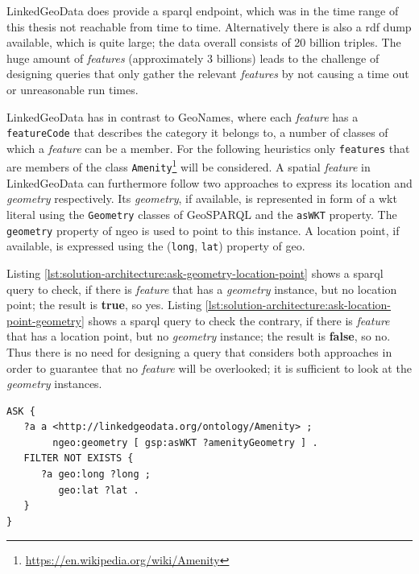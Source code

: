 \documentclass[draft,final]{vutinfth} %
\begin{document}
LinkedGeoData does provide a \gls{sparql} endpoint, which was in the time range of this thesis not reachable from time to time. Alternatively there is also a \gls{rdf} dump available, which is quite large; the data overall consists of 20 billion triples. The huge amount of \textit{features} (approximately 3 billions) leads to the challenge of designing queries that only gather the relevant \textit{features} by not causing a time out or unreasonable run times. 

LinkedGeoData has in contrast to GeoNames, where each \textit{feature} has a \texttt{featureCode} that describes the category it belongs to, a number of classes of which a \textit{feature} can be a member. For the following heuristics only \texttt{features} that are members of the class \texttt{Amenity}\footnote{\url{https://en.wikipedia.org/wiki/Amenity}} will be considered. A spatial \textit{feature} in LinkedGeoData can furthermore follow two approaches to express its location and \textit{geometry} respectively. Its \textit{geometry}, if available, is represented in form of a \gls{wkt} literal using the \texttt{Geometry} classes of GeoSPARQL and the \texttt{asWKT} property. The \texttt{geometry} property of \gls{ngeo} is used to point to this instance. A location point, if available, is expressed using the (\texttt{long}, \texttt{lat}) property of \gls{geo}. 

Listing \ref{lst:solution-architecture:ask-geometry-location-point} shows a \gls{sparql} query to check, if there is \textit{feature} that has a \textit{geometry} instance, but no location point; the result is \textbf{true}, so yes. Listing \ref{lst:solution-architecture:ask-location-point-geometry} shows a \gls{sparql} query to check the contrary, if there is \textit{feature} that has a location point, but no \textit{geometry} instance; the result is \textbf{false}, so no. Thus there is no need for designing a query that considers both approaches in order to guarantee that no \textit{feature} will be overlooked; it is sufficient to look at the \textit{geometry} instances.

\begin{lstlisting}[language=sparql, frame=single, basicstyle=\footnotesize, caption=Ask if there is a feature with a geometry instance that has no location point., label={lst:solution-architecture:ask-geometry-location-point}]
ASK {
   ?a a <http://linkedgeodata.org/ontology/Amenity> ;
        ngeo:geometry [ gsp:asWKT ?amenityGeometry ] .
   FILTER NOT EXISTS {
      ?a geo:long ?long ;
         geo:lat ?lat .
   }
}
\end{lstlisting}
\end{document}
